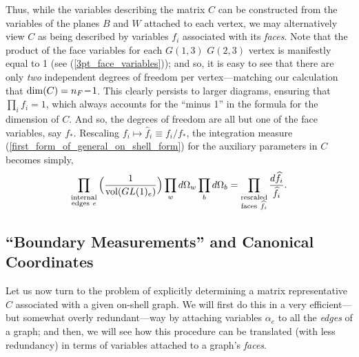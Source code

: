 \documentclass[12pt,hyperref,compress]{JHEP3}
\renewcommand{\hat}{\widehat}
\newcommand{\eq}[1]{\begin{equation}#1\end{equation}}
\newcommand{\mi}{{\rm\rule[2.4pt]{6pt}{0.65pt}}}
\begin{document}
Thus, while the variables describing the matrix $C$ can be constructed from the variables of the planes $B$ and $W$ attached to each vertex, we may alternatively view $C$ as being described by variables $f_i$ associated with its {\it faces}. Note that the product of the face variables for each $G(1,3)$ $G(2,3)$ vertex is manifestly equal to 1 (see (\ref{3pt_face_variables})); and so, it is easy to see that there are only {\it two} independent degrees of freedom per vertex---matching our calculation that $\dim(C)=n_F\,\mi\,1$. This clearly persists to larger diagrams, ensuring that $\prod_if_i=1$, which always accounts for the ``minus 1'' in the formula for the dimension of $C$. And so, the degrees of freedom are all but one of the face variables, say $f_*$. Rescaling $f_i\!\mapsto\!\hat{f}_i\equiv f_i/f_*$, the integration measure (\ref{first_form_of_general_on_shell_form}) for the auxiliary parameters  in $C$ becomes simply,
\vspace{-.2cm}\eq{\prod_{\substack{\mathrm{internal}\\\mathrm{edges~}e}}\Big(\frac{1}{{\rm vol}(GL(1)_e)}\Big) \prod_w d \Omega_w \prod_b d \Omega_b=\prod_{\substack{\text{rescaled}\\\text{faces}~\hat{f}_i}}\frac{d\hat{f}_i}{\hat{f}_i}.\vspace{-.2cm}}


\newpage
\subsection{``Boundary Measurements'' and Canonical Coordinates}\label{boundary_measurements_section}
Let us now turn to the problem of explicitly determining a matrix representative $C$ associated with a given on-shell graph. We will first do this in a very efficient---but somewhat overly redundant---way by attaching variables $\alpha_e$ to all the {\it edges} of a graph; and then, we will see how this procedure can be translated (with less redundancy) in terms of variables attached to a graph's {\it faces}.
\end{document}

